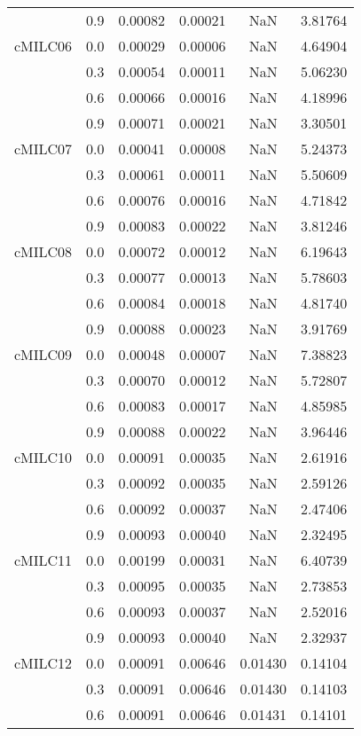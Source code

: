 \begin{longtable}{cccccc}
        & 0.9 & 0.00082 & 0.00021 & NaN & 3.81764 \\
cMILC06 & 0.0 & 0.00029 & 0.00006 & NaN & 4.64904 \\
        & 0.3 & 0.00054 & 0.00011 & NaN & 5.06230 \\
        & 0.6 & 0.00066 & 0.00016 & NaN & 4.18996 \\
        & 0.9 & 0.00071 & 0.00021 & NaN & 3.30501 \\
cMILC07 & 0.0 & 0.00041 & 0.00008 & NaN & 5.24373 \\
        & 0.3 & 0.00061 & 0.00011 & NaN & 5.50609 \\
        & 0.6 & 0.00076 & 0.00016 & NaN & 4.71842 \\
        & 0.9 & 0.00083 & 0.00022 & NaN & 3.81246 \\
cMILC08 & 0.0 & 0.00072 & 0.00012 & NaN & 6.19643 \\
        & 0.3 & 0.00077 & 0.00013 & NaN & 5.78603 \\
        & 0.6 & 0.00084 & 0.00018 & NaN & 4.81740 \\
        & 0.9 & 0.00088 & 0.00023 & NaN & 3.91769 \\
cMILC09 & 0.0 & 0.00048 & 0.00007 & NaN & 7.38823 \\
        & 0.3 & 0.00070 & 0.00012 & NaN & 5.72807 \\
        & 0.6 & 0.00083 & 0.00017 & NaN & 4.85985 \\
        & 0.9 & 0.00088 & 0.00022 & NaN & 3.96446 \\
cMILC10 & 0.0 & 0.00091 & 0.00035 & NaN & 2.61916 \\
        & 0.3 & 0.00092 & 0.00035 & NaN & 2.59126 \\
        & 0.6 & 0.00092 & 0.00037 & NaN & 2.47406 \\
        & 0.9 & 0.00093 & 0.00040 & NaN & 2.32495 \\
cMILC11 & 0.0 & 0.00199 & 0.00031 & NaN & 6.40739 \\
        & 0.3 & 0.00095 & 0.00035 & NaN & 2.73853 \\
        & 0.6 & 0.00093 & 0.00037 & NaN & 2.52016 \\
        & 0.9 & 0.00093 & 0.00040 & NaN & 2.32937 \\
cMILC12 & 0.0 & 0.00091 & 0.00646 & 0.01430 & 0.14104 \\
        & 0.3 & 0.00091 & 0.00646 & 0.01430 & 0.14103 \\
        & 0.6 & 0.00091 & 0.00646 & 0.01431 & 0.14101 \\

\end{longtable}
